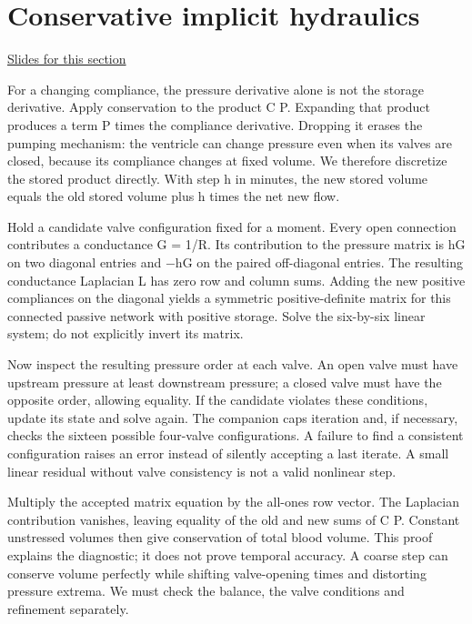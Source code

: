 \documentclass[11pt,letterpaper]{article}
\theoremstyle{definition}\newtheorem{definition}{Definition}\newtheorem{example}{Example}
\numberwithin{equation}{section}
\begin{document}
\section{Conservative implicit hydraulics}
\hypertarget{note-conservative-implicit-hydraulics}{}\label{note:conservative-implicit-hydraulics}
{\small \href{slides.html\#frame=the-implicit-hydraulic-step\&step=1}{Slides for this section}}\par
For a changing compliance, the pressure derivative alone is not the storage derivative. Apply conservation to the product C P. Expanding that product produces a term P times the compliance derivative. Dropping it erases the pumping mechanism: the ventricle can change pressure even when its valves are closed, because its compliance changes at fixed volume. We therefore discretize the stored product directly. With step h in minutes, the new stored volume equals the old stored volume plus h times the net new flow.

Hold a candidate valve configuration fixed for a moment. Every open connection contributes a conductance G = 1/R. Its contribution to the pressure matrix is hG on two diagonal entries and \ensuremath{-}hG on the paired off-diagonal entries. The resulting conductance Laplacian L has zero row and column sums. Adding the new positive compliances on the diagonal yields a symmetric positive-definite matrix for this connected passive network with positive storage. Solve the six-by-six linear system; do not explicitly invert its matrix.

Now inspect the resulting pressure order at each valve. An open valve must have upstream pressure at least downstream pressure; a closed valve must have the opposite order, allowing equality. If the candidate violates these conditions, update its state and solve again. The companion caps iteration and, if necessary, checks the sixteen possible four-valve configurations. A failure to find a consistent configuration raises an error instead of silently accepting a last iterate. A small linear residual without valve consistency is not a valid nonlinear step.

Multiply the accepted matrix equation by the all-ones row vector. The Laplacian contribution vanishes, leaving equality of the old and new sums of C P. Constant unstressed volumes then give conservation of total blood volume. This proof explains the diagnostic; it does not prove temporal accuracy. A coarse step can conserve volume perfectly while shifting valve-opening times and distorting pressure extrema. We must check the balance, the valve conditions and refinement separately.
\end{document}
